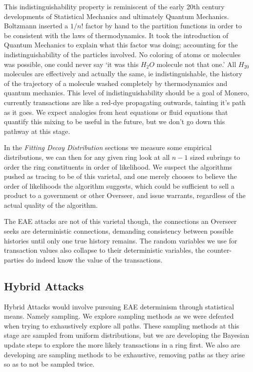 This indistinguishability property is reminiscent of the early 20th century developments of Statistical Mechanics and ultimately Quantum Mechanics.  
Boltzmann inserted a $1/n!$ factor by hand to the partition functions in order to be consistent with the laws of thermodynamics.  
It took the introduction of Quantum Mechanics to explain what this factor was doing; accounting for the indistinguishability of the particles involved.
No coloring of atoms or molecules was possible, one could never say `it was this $H_2O$ molecule not that one.'  
All $H_20$ molecules are effectively and actually the same, ie indistinguishable, the history of the trajectory of a molecule washed completely by thermodynamics and quantum mechanics.
This level of indistinguishability should be a goal of Monero, currently transactions are like a red-dye propagating outwards, tainting it's path as it goes.  
We expect analogies from heat equations or fluid equations that quantify this mixing to be useful in the future, but we don't go down this pathway at this stage.

In the \textit{Fitting Decoy Distribution} sections we measure some empirical distributions, we can then for any given ring look at all $n-1$ sized subrings to order the ring constituents in order of likelihood.  
We suspect the algorithms pushed as tracing to be of this varietal, and one merely chooses to believe the order of likelihoods the algorithm suggests, which could be sufficient to sell a product to a government or other Overseer, and issue warrants, regardless of the actual quality of the algorithm.

The EAE attacks are not of this varietal though, the connections an Overseer seeks are deterministic connections, demanding consistency between possible histories until only one true history remains.  
The random variables we use for transaction values also collapse to their deterministic variables, the counter-parties do indeed know the value of the transactions.

\subsection{Hybrid Attacks}

Hybrid Attacks would involve pursuing EAE determinism through statistical means.  Namely sampling.  
We explore sampling methods as we were defeated when trying to exhaustively explore all paths.
These sampling methods at this stage are sampled from uniform distributions, but we are developing the Bayesian update steps to explore the more likely transactions in a ring first.
We also are developing are sampling methods to be exhaustive, removing paths as they arise so as to not be sampled twice.


